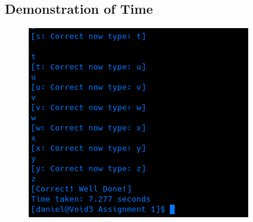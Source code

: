 \documentclass{article}
\begin{document}
	\subsection{Demonstration of Time}
		\begin{figure}[!h]
			\centering
			\includegraphics[width=\textwidth]{3.png}
		\end{figure}
	
	
\end{document}
